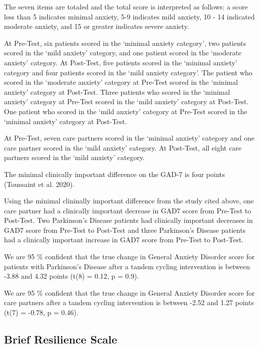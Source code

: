 \documentclass[
]{article}
\begin{document}
The seven items are totaled and the total score is interpreted as
follows: a score less than 5 indicates minimal anxiety, 5-9 indicates
mild anxiety, 10 - 14 indicated moderate anxiety, and 15 or greater
indicates severe anxiety.

At Pre-Test, six patients scored in the `minimal anxiety category', two
patients scored in the `mild anxiety' category, and one patient scored
in the `moderate anxiety' category. At Post-Test, five patients scored
in the `minimal anxiety' category and four patients scored in the `mild
anxiety category'. The patient who scored in the `moderate anxiety'
category at Pre-Test scored in the `minimal anxiety' category at
Post-Test. Three patients who scored in the `minimal anxiety' category
at Pre-Test scored in the `mild anxiety' category at Post-Test. One
patient who scored in the `mild anxiety' category at Pre-Test scored in
the `minimal anxiety' category at Post-Test.

At Pre-Test, seven care partners scored in the `minimal anxiety'
category and one care partner scored in the `mild anxiety' category. At
Post-Test, all eight care partners scored in the `mild anxiety'
category.

The minimal clinically important difference on the GAD-7 is four points
(Toussaint et al. 2020).

Using the minimal clininally important difference from the study cited
above, one care partner had a clinically important decrease in GAD7
score from Pre-Test to Post-Test. Two Parkinson's Disease patients had
clinically important decreases in GAD7 score from Pre-Test to Post-Test
and three Parkinson's Disease patients had a clinically important
increase in GAD7 score from Pre-Test to Post-Test.

We are 95 \(\%\) confident that the true change in General Anxiety
Disorder score for patients with Parkinson's Disease after a tandem
cycling intervention is between -3.88 and 4.32 points (t(8) = 0.12, p =
0.9).

We are 95 \(\%\) confident that the true change in General Anxiety
Disorder score for care partners after a tandem cycling intervention is
between -2.52 and 1.27 points (t(7) = -0.78, p = 0.46).

\hypertarget{brief-resilience-scale}{%
\subsection{Brief Resilience Scale}\label{brief-resilience-scale}}
\end{document}
